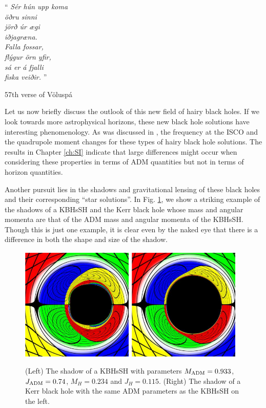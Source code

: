 \epigraph{``\emph{
Sér hún upp koma \\
öðru sinni \\
jörð úr ægi \\
iðjagræna. \\
Falla fossar, \\
flýgur örn yfir, \\
sá er á fjalli \\
fiska veiðir. 
} 
''}{57th verse of Völuspá}

Let us now briefly discuss the outlook of this new field of hairy black holes.
If we look towards more astrophysical horizons, these new black hole solutions have interesting phenomenology.
As was discussed in \cite{Herdeiro:2014goa,Herdeiro:2015gia}, the frequency at the ISCO and the quadrupole moment changes for these types of hairy black hole solutions.
The results in Chapter \ref{ch:SI} indicate that large differences might occur when considering these properties in terms of ADM quantities but not in terms of horizon quantities.

Another pursuit lies in the shadows and gravitational lensing of these black holes \cite{Cunha:2015yba,Cunha:2016bjh} and their corresponding ``star solutions''.
In Fig. \ref{shadows}, we show a striking example of the shadows of a KBHsSH and the Kerr black hole whose mass and angular momenta are that of the ADM mass and angular momenta of the KBHsSH.
Though this is just one example, it is clear even by the naked eye that there is a difference in both the shape and size of the shadow.

\begin{figure}[h!]
\centering
  \includegraphics[width=0.48\textwidth]{Figs/skuggi2a.pdf}
  \includegraphics[width=0.48\textwidth]{Figs/skuggi2b.pdf}
  \caption{(Left) The shadow of a KBHsSH with parameters $M_{\rm ADM}=0.933$, $J_{\rm ADM}=0.74$, $M_H=0.234$ and $J_H=0.115$. (Right) The shadow of a Kerr black hole with the same ADM parameters as the KBHsSH on the left.}
\label{shadows}
\end{figure}

